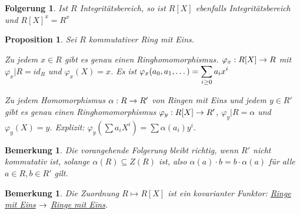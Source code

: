 \documentclass[a4paper,10pt,german]{scrbook}
\theoremstyle{saetze}
\theoremstyle{definitionen}
\newtheorem{Bem}[Def]{Bemerkung}
\newtheorem{Prop}[Def]{Proposition}
\newtheorem{Folg}[Def]{Folgerung}
\begin{document}
\begin{Folg}
Ist $R$ Integritätsbereich, so ist $R[X]$
ebenfalls Integritätsbereich und $R[X]^x = R^x$
\end{Folg}
\begin{Prop}
Sei $R$ kommutativer Ring mit Eins.
\begin{enum}
\item Zu jedem $x \in R$ gibt es genau einen Ringhomomorphismus.
$\varphi_x: R[X] \rightarrow R$ mit $\varphi_x|R = id_R$ und $\varphi_x(X) =
x$. Es ist $\displaystyle \varphi_x(a_0, a_1, \dots) = \sum_{i\geq 0} a_i x^i$
\item Zu jedem Homomorphismus $\alpha: R \rightarrow R'$ von Ringen mit Eins
und jedem $y \in R'$ gibt es genau einen Ringhomomorphismus
$\varphi_y:R[X]\rightarrow R'$, $\varphi_y|R = \alpha$ und $\varphi_y(X) =
y$. Explizit: $\varphi_y(\sum a_iX^i)=\sum\alpha(a_i)y^i$.
\end{enum}
\end{Prop}

\begin{Bem}
Die vorangehende Folgerung bleibt richtig, wenn $R'$ nicht kommutativ ist, solange $\alpha(R)\subseteq Z(R)$ ist, also $\alpha(a)\cdot b = b\cdot \alpha(a)$ für alle $a\in R, b\in R'$ gilt.
\end{Bem}

\begin{Bem}
Die Zuordnung $R \mapsto R[X]$ ist ein
kovarianter Funktor: \underline{Ringe mit Eins} $\rightarrow$ \underline{Ringe mit Eins}.

\end{Bem}
\end{document}
